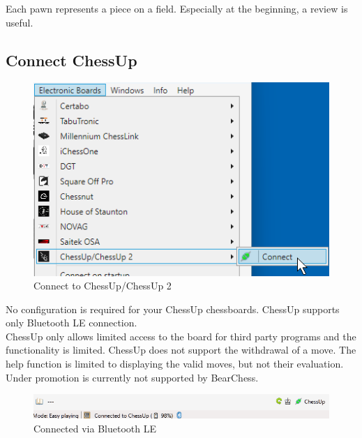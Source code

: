 \documentclass[11pt,a4paper]{article}
\begin{document}
Each pawn represents a piece on a field. Especially at the beginning, a review is useful. 

\subsection{Connect ChessUp} \label{ConnectChessUp}
\begin{figure}[H]
	\centering
	\includegraphics[scale=1.0]{ChessUp1.png}
	\caption{Connect to ChessUp/ChessUp 2 }
	\label{fig:ChessUp1}
\end{figure}

No configuration is required for your ChessUp chessboards. ChessUp supports only Bluetooth LE connection.\\ 
ChessUp only allows limited access to the board for third party programs and the functionality is limited. ChessUp does not support the withdrawal of a move. The help function is limited to displaying the valid moves, but not their evaluation. Under promotion is currently not supported by BearChess.\\

\begin{figure}[H]
	\centering
	\includegraphics[scale=0.7]{ChessUp2.png}
	\caption{Connected via Bluetooth LE}
	\label{fig:ChessUp2}
\end{figure}
\end{document}
